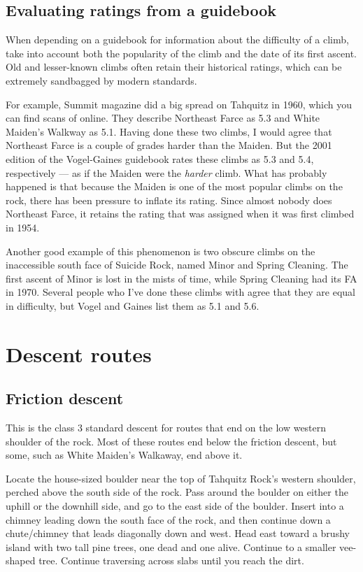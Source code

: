\documentclass{tahquitz}
\begin{document}
\subsection{Evaluating ratings from a guidebook}

When depending on a guidebook for information about the difficulty of a climb, take
into account both the popularity of the climb and the date of its first ascent.
Old and lesser-known climbs often retain their historical ratings, which can be
extremely sandbagged by modern standards.

For example,
Summit magazine did a big spread on Tahquitz in 1960, which you can find scans of online.
They describe Northeast Farce as 5.3 and White Maiden's Walkway as 5.1. Having done
these two climbs, I would agree that Northeast Farce is a couple of grades harder
than the Maiden. But the 2001 edition
of the Vogel-Gaines guidebook rates these climbs as 5.3 and 5.4, respectively --- as if
the Maiden were the \emph{harder} climb. What has
probably happened is that because the Maiden is one of the most popular climbs on
the rock, there has been pressure to inflate its rating. Since almost nobody does Northeast
Farce, it retains the rating that was assigned when it was first climbed in 1954.

Another good example of this phenomenon is two obscure climbs on the inaccessible
south face of Suicide Rock, named Minor and Spring Cleaning. The first ascent of Minor is
lost in the mists of time, while Spring Cleaning had its FA in 1970. Several people who
I've done these climbs with agree that they are equal in difficulty, but Vogel and Gaines
list them as 5.1 and 5.6.

\pagebreak

\section{Descent routes}

\subsection{Friction descent}\label{subsec:friction-descent}

This is the class 3 standard descent for routes that end on the low western shoulder of the rock.
Most of these routes end below the friction descent, but some, such as White Maiden's Walkaway,
end above it.

Locate the house-sized boulder near the top of Tahquitz Rock's western shoulder,
perched above the south side of the rock. Pass around the boulder on either the
uphill or the downhill side, and go to the east side of the boulder. Insert into a chimney
leading down the south face of the rock, and then continue down a
chute/chimney that leads diagonally down and west.  Head east toward a
brushy island with two tall pine trees, one dead and one alive. Continue
to a smaller vee-shaped tree. Continue traversing across
slabs until you reach the dirt.
\end{document}
